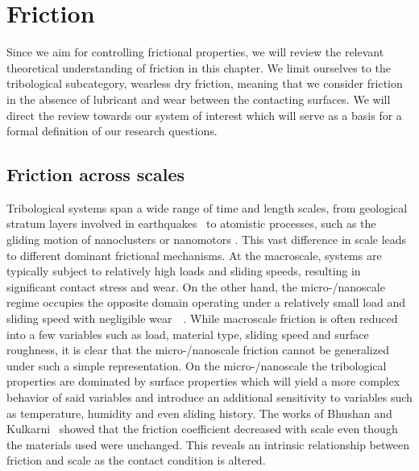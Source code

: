 
\chapter{Friction}\label{chap:friction} 
Since we aim for controlling frictional properties, we will review the relevant theoretical understanding of friction in this chapter. We limit ourselves to the tribological subcategory, wearless dry friction, meaning that we consider friction in the absence of lubricant and wear between the contacting surfaces. We will direct the review towards our system of interest which will serve as a basis for a formal definition of our research questions.



\section{Friction across scales}
Tribological systems span a wide range of time and length scales, from
geological stratum layers involved in earthquakes~\cite{kim_nano-scale_2009} to
atomistic processes, such as the gliding motion of nanoclusters or nanomotors
\cite{Manini_2016}. This vast difference in scale leads to different dominant
frictional mechanisms. At the macroscale, systems are typically subject to
relatively high loads and sliding speeds, resulting in significant contact
stress and wear. On the other hand, the micro-/nanoscale regime occupies the
opposite domain operating under a relatively small load and sliding speed with
negligible wear~\cite{kim_nano-scale_2009}~\cite[p. 5]{bhushan_2013}. While
macroscale friction is often reduced into a few variables such as load, material
type, sliding speed and surface roughness, it is clear that the micro-/nanoscale
friction cannot be generalized under such a simple representation. On the
micro-/nanoscale the tribological properties are dominated by surface properties
which will yield a more complex behavior of said variables and introduce an
additional sensitivity to variables such as temperature, humidity and even
sliding history. The works of Bhushan and Kulkarni~\cite{BHUSHAN199649} showed
that the friction coefficient decreased with scale even though the materials
used were unchanged. This reveals an intrinsic relationship between friction and
scale as the contact condition is altered.




